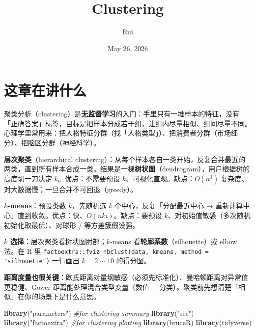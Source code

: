 \documentclass[
]{ctexart}
\title{Clustering}
\author{Rui}
\date{May 26, 2026}
\newenvironment{Shaded}{\begin{snugshade}}{\end{snugshade}}
\newcommand{\CommentTok}[1]{\textcolor[rgb]{0.56,0.35,0.01}{\textit{#1}}}
\newcommand{\FunctionTok}[1]{\textcolor[rgb]{0.13,0.29,0.53}{\textbf{#1}}}
\newcommand{\NormalTok}[1]{#1}
\newcommand{\StringTok}[1]{\textcolor[rgb]{0.31,0.60,0.02}{#1}}
\begin{document}
\maketitle

{
\setcounter{tocdepth}{2}
\tableofcontents
}
\hypertarget{ux8fd9ux7ae0ux5728ux8bb2ux4ec0ux4e48}{%
\section{这章在讲什么}\label{ux8fd9ux7ae0ux5728ux8bb2ux4ec0ux4e48}}

聚类分析（clustering）是\textbf{无监督学习}的入门：手里只有一堆样本的特征，没有「正确答案」标签，目标是把样本分成若干组，让组内尽量相似、组间尽量不同。心理学里常用来：把人格特征分群（找「人格类型」）、把消费者分群（市场细分）、把脑区分群（神经科学）。

\begin{concept}[两大主流方法的选择]
\textbf{层次聚类}（hierarchical clustering）：从每个样本各自一类开始，反复合并最近的两类，直到所有样本合成一类。结果是一棵\textbf{树状图}（dendrogram），用户根据树的高度切一刀决定 $k$。优点：不需要预设 $k$、可视化直观。缺点：$O(n^3)$ 复杂度、对大数据慢；一旦合并不可回退（greedy）。

\textbf{$k$-means}：预设类数 $k$，先随机选 $k$ 个中心，反复「分配最近中心 → 重新计算中心」直到收敛。优点：快、$O(nki)$。缺点：要预设 $k$、对初始值敏感（多次随机初始化取最优）、对球形 / 等方差簇假设强。

\textbf{$k$ 选择}：层次聚类看树状图肘部；$k$-means 看\textbf{轮廓系数}（silhouette）或 elbow 法。在 R 里 \texttt{factoextra::fviz\_nbclust(data, kmeans, method = "silhouette")} 一行画出 $k = 2 \sim 10$ 的得分图。
\end{concept}

\textbf{距离度量也很关键}：欧氏距离对量纲敏感（必须先标准化）、曼哈顿距离对异常值更稳健、Gower
距离能处理混合类型变量（数值 +
分类）。聚类前先想清楚「相似」在你的场景下是什么意思。

\begin{Shaded}
\begin{Highlighting}[]
\FunctionTok{library}\NormalTok{(}\StringTok{"parameters"}\NormalTok{)  }\CommentTok{\#for clustering summary}
\FunctionTok{library}\NormalTok{(}\StringTok{"see"}\NormalTok{)}
\FunctionTok{library}\NormalTok{(}\StringTok{"factoextra"}\NormalTok{)  }\CommentTok{\#for clustering plotting}
\FunctionTok{library}\NormalTok{(bruceR)}
\FunctionTok{library}\NormalTok{(tidyverse)}
\end{Highlighting}
\end{Shaded}
\end{document}
